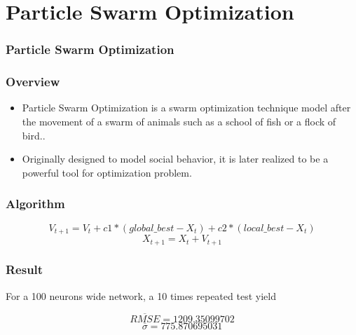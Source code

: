 \documentclass{beamer}
\begin{document}
\section{Particle Swarm Optimization}
\begin{frame}
    \frametitle{Particle Swarm Optimization}
    \tableofcontents[currentsection]
\end{frame}
\begin{frame}
    \frametitle{Overview}
    \begin{itemize}
        \item<1-> Particle Swarm Optimization is a swarm optimization technique model after the movement of a swarm of animals such as a school of fish or a flock of bird.\cite{eberhart_new_1995}. 
        \item<2> Originally designed to model social behavior, it is later realized to be a powerful tool for optimization problem.
    \end{itemize}
\end{frame}
\begin{frame}
    \frametitle{Algorithm}
    \begin{equation}
        V_{t+1} = V_t + c1*(global\_best - X_t) + c2*(local\_best - X_t)
    \end{equation}
    \begin{equation}
        X_{t+1} = X_{t} + V_{t+1}
    \end{equation}
\end{frame}
\begin{frame}
    \frametitle{Result}
    \begin{center}
        For a 100 neurons wide network, a 10 times repeated test yield
    \end{center}
    \begin{equation*}
        \overline{RMSE} = 1209.35099702    
    \end{equation*}
    \begin{equation*}
        \overline{\sigma} = 775.870695031
    \end{equation*}
\end{frame}
\end{document}
